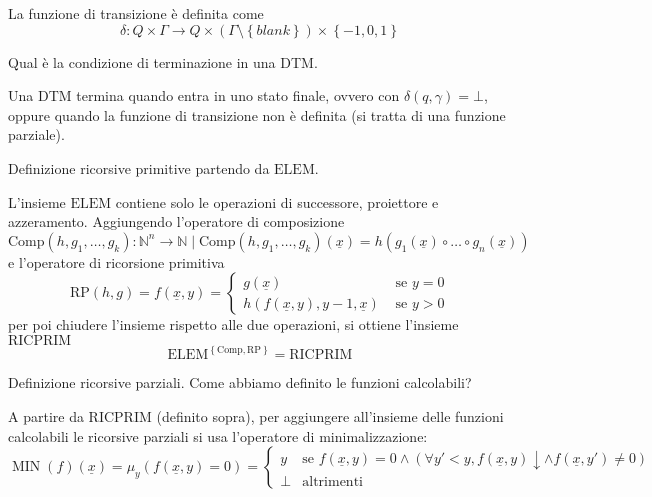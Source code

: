 \documentclass[12pt, answers]{exam}
\theoremstyle{plain}
\DeclareMathOperator{\MIN}{MIN}
\newcommand{\elem}{\text{ELEM}}
\newcommand{\comp}{\text{Comp}}
\newcommand{\rp}{\text{RP}}
\newcommand{\ricprim}{\text{RICPRIM}}
\newcommand{\N}{\mathbb{N}}
\begin{document}
\begin{questions}
\begin{solution}
            La funzione di transizione è definita come
            $$ \delta: Q \times \Gamma \rightarrow Q \times (\Gamma \setminus \left\{ blank \right\}) \times \left\{-1, 0, 1\right\} $$
        \end{solution}
        
        \question Qual è la condizione di terminazione in una DTM.
        
        \begin{solution}
            Una DTM termina quando entra in uno stato finale, ovvero con $\delta (q, \gamma) = \bot$, oppure quando la funzione di transizione non è definita (si tratta di una funzione parziale).
        \end{solution}
        
        \question Definizione ricorsive primitive partendo da $\elem$.
        
        \begin{solution}
            L'insieme $\elem$ contiene solo le operazioni di successore, proiettore e azzeramento. Aggiungendo l'operatore di composizione 
            $$ \comp (h, g_1, \dots, g_k): \N^n \rightarrow \N \mid \comp (h, g_1, \dots, g_k) (\underline{x}) = h(g_1 (\underline{x}) \circ \dots \circ g_n (\underline{x})) $$
            e l'operatore di ricorsione primitiva
            $$ \rp (h, g) = f(\underline{x}, y) = \begin{cases}
                g(\underline{x}) & \text{ se } y = 0 \\
                h(f(\underline{x}, y), y-1, \underline{x}) & \text{ se } y > 0 
            \end{cases}$$
            per poi chiudere l'insieme rispetto alle due operazioni, si ottiene l'insieme $\ricprim$
            $$ \elem^{\left\{\comp, \rp\right\}} = \ricprim $$
        \end{solution}
        
        \question Definizione ricorsive parziali. Come abbiamo definito le funzioni calcolabili?
        
        \begin{solution}
            A partire da $\ricprim$ (definito sopra), per aggiungere all'insieme delle funzioni calcolabili le ricorsive parziali si usa l'operatore di minimalizzazione: 
            $$ \MIN (f) (\underline{x}) = \mu_y (f(\underline{x}, y) = 0) = \begin{cases}
                y & \text{se } f(\underline{x}, y) = 0 \wedge (\forall y' < y, f(\underline{x}, y) \downarrow \wedge f(\underline{x}, y') \neq 0) \\
                \bot & \text{altrimenti}
            \end{cases} $$
            

\end{solution}
\end{questions}
\end{document}
